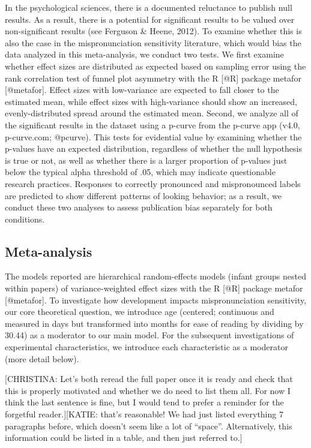 \documentclass[man]{apa6}
\theoremstyle{definition}
\theoremstyle{definition}
\theoremstyle{definition}
\theoremstyle{remark}
\begin{document}
In the psychological sciences, there is a documented reluctance to
publish null results. As a result, there is a potential for significant
results to be valued over non-significant results (see Ferguson \&
Heene, 2012). To examine whether this is also the case in the
mispronunciation sensitivity literature, which would bias the data
analyzed in this meta-analysis, we conduct two tests. We first examine
whether effect sizes are distributed as expected based on sampling error
using the rank correlation test of funnel plot asymmetry with the R
{[}@R{]} package metafor {[}@metafor{]}. Effect sizes with low-variance
are expected to fall closer to the estimated mean, while effect sizes
with high-variance should show an increased, evenly-distributed spread
around the estimated mean. Second, we analyze all of the significant
results in the dataset using a p-curve from the p-curve app (v4.0,
p-curve.com; @pcurve). This tests for evidential value by examining
whether the p-values have an expected distribution, regardless of
whether the null hypothesis is true or not, as well as whether there is
a larger proportion of p-values just below the typical alpha threshold
of .05, which may indicate questionable research practices. Responses to
correctly pronounced and mispronounced labels are predicted to show
different patterns of looking behavior; as a result, we conduct these
two analyses to assess publication bias separately for both conditions.

\subsection{Meta-analysis}\label{meta-analysis}

The models reported are hierarchical random-effects models (infant
groups nested within papers) of variance-weighted effect sizes with the
R {[}@R{]} package metafor {[}@metafor{]}. To investigate how
development impacts mispronunciation sensitivity, our core theoretical
question, we introduce age (centered; continuous and measured in days
but transformed into months for ease of reading by dividing by 30.44) as
a moderator to our main model. For the subsequent investigations of
experimental characteristics, we introduce each characteristic as a
moderator (more detail below).

{[}CHRISTINA: Let's both reread the full paper once it is ready and
check that this is properly motivated and whether we do need to list
them all. For now I think the last sentence is fine, but I would tend to
prefer a reminder for the forgetful reader.{]}{[}KATIE: that's
reasonable! We had just listed everything 7 paragraphs before, which
doesn't seem like a lot of \enquote{space}. Alternatively, this
information could be listed in a table, and then just referred to.{]}
\end{document}
